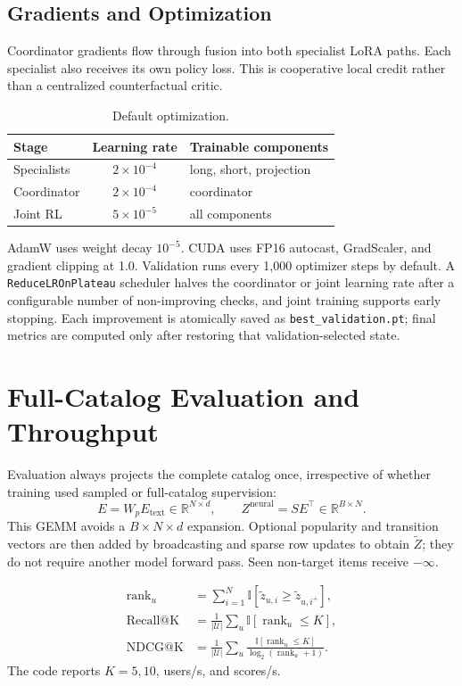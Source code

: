 \documentclass[11pt,a4paper]{article}
\newcommand{\R}{\mathbb{R}}
\begin{document}
\subsection{Gradients and Optimization}

Coordinator gradients flow through fusion into both specialist LoRA paths. Each specialist also receives its own policy loss. This is cooperative local credit rather than a centralized counterfactual critic.

\begin{table}[H]
\centering
\caption{Default optimization.}
\begin{tabular}{lcl}
\toprule
Stage & Learning rate & Trainable components\\
\midrule
Specialists & $2\times10^{-4}$ & long, short, projection\\
Coordinator & $2\times10^{-4}$ & coordinator\\
Joint RL & $5\times10^{-5}$ & all components\\
\bottomrule
\end{tabular}
\end{table}
AdamW uses weight decay $10^{-5}$. CUDA uses FP16 autocast, GradScaler, and gradient clipping at 1.0. Validation runs every 1,000 optimizer steps by default. A \texttt{ReduceLROnPlateau} scheduler halves the coordinator or joint learning rate after a configurable number of non-improving checks, and joint training supports early stopping. Each improvement is atomically saved as \texttt{best\_validation.pt}; final metrics are computed only after restoring that validation-selected state.

\section{Full-Catalog Evaluation and Throughput}

Evaluation always projects the complete catalog once, irrespective of whether
training used sampled or full-catalog supervision:
\begin{equation}
  E=W_pE_{\mathrm{text}}\in\R^{N\times d},
  \qquad Z^{\mathrm{neural}}=SE^\top\in\R^{B\times N}.
\end{equation}
This GEMM avoids a $B\times N\times d$ expansion. Optional popularity and
transition vectors are then added by broadcasting and sparse row updates to
obtain $\widetilde Z$; they do not require another model forward pass. Seen
non-target items receive $-\infty$.

\begin{align}
  \operatorname{rank}_u
  &=\sum_{i=1}^N\mathbb{I}[\widetilde z_{u,i}\geq
    \widetilde z_{u,i^+}],\\
  \operatorname{Recall@K}
  &=\frac1{|\mathcal U|}\sum_u\mathbb{I}[\operatorname{rank}_u\leq K],\\
  \operatorname{NDCG@K}
  &=\frac1{|\mathcal U|}\sum_u
  \frac{\mathbb{I}[\operatorname{rank}_u\leq K]}
       {\log_2(\operatorname{rank}_u+1)}.
\end{align}
The code reports $K=5,10$, users/s, and scores/s.
\end{document}
